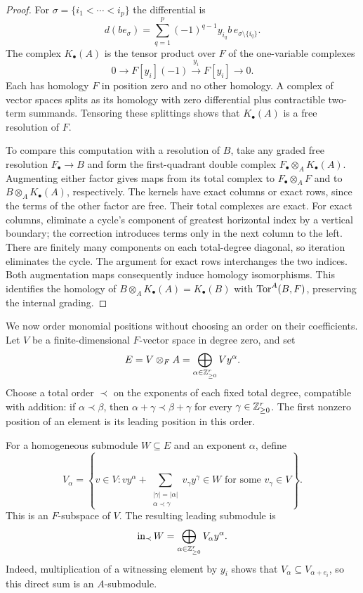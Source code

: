 \begin{proof}
For $\sigma=\{i_1<\cdots<i_p\}$ the differential is
\[
 d(be_\sigma)=\sum_{q=1}^p(-1)^{q-1}y_{i_q}b\,
                    e_{\sigma\setminus\{i_q\}}.
\]
The complex $K_\bullet(A)$ is the tensor product over $F$ of the
one-variable complexes
\[
 0\longrightarrow F[y_i](-1)
   \xrightarrow{\ y_i\ }F[y_i]\longrightarrow0.
\]
Each has homology $F$ in position zero and no other homology.  A complex
of vector spaces splits as its homology with zero differential plus
contractible two-term summands.  Tensoring these splittings shows that
$K_\bullet(A)$ is a free resolution of $F$.

To compare this computation with a resolution of $B$, take any graded
free resolution $F_\bullet\to B$ and form the first-quadrant double
complex $F_\bullet\otimes_A K_\bullet(A)$.  Augmenting either factor
gives maps from its total complex to $F_\bullet\otimes_A F$ and to
$B\otimes_A K_\bullet(A)$, respectively.  The kernels have exact columns
or exact rows, since the terms of the other factor are free.  Their
total complexes are exact.  For exact columns, eliminate a cycle's
component of greatest horizontal index by a vertical boundary; the
correction introduces terms only in the next column to the left.
There are finitely many components on each total-degree diagonal,
so iteration eliminates the cycle.  The argument for exact rows
interchanges the two indices.  Both augmentation maps consequently induce
homology isomorphisms.  This identifies the homology of
$B\otimes_A K_\bullet(A)=K_\bullet(B)$ with $\operatorname{Tor}^A(B,F)$, preserving
the internal grading.
\end{proof}

We now order monomial positions without choosing an order on their
coefficients.  Let $V$ be a finite-dimensional $F$-vector space in
degree zero, and set
\[
 E=V\otimes_F A=\bigoplus_{\alpha\in\mathbb Z_{\geq0}^r}Vy^\alpha.
\]
Choose a total order $\prec$ on the exponents of each fixed total
degree, compatible with addition: if $\alpha\prec\beta$, then
$\alpha+\gamma\prec\beta+\gamma$ for every
$\gamma\in\mathbb Z_{\geq0}^r$.  The first nonzero position of an element is
its leading position in this order.

For a homogeneous submodule $W\subseteq E$ and an exponent $\alpha$,
define
\[
 V_\alpha=\left\{v\in V:
   vy^\alpha+\sum_{\substack{|\gamma|=|\alpha|\\\alpha\prec\gamma}}
        v_\gamma y^\gamma\in W
        \text{ for some }v_\gamma\in V\right\}.
\]
This is an $F$-subspace of $V$.  The resulting leading submodule is
\[
 \operatorname{in}_{\prec}W
       =\bigoplus_{\alpha\in\mathbb Z_{\geq0}^r}V_\alpha y^\alpha.
\]
Indeed, multiplication of a witnessing element by $y_i$ shows that
$V_\alpha\subseteq V_{\alpha+e_i}$, so this direct sum is an
$A$-submodule.

